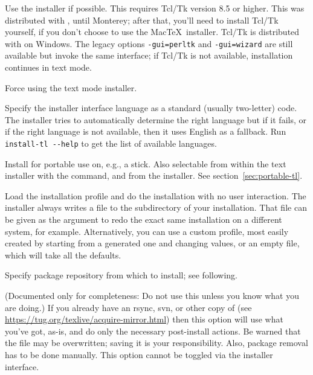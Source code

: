 \documentclass{article}
\begin{document}
\begin{ttdescription}
\item[-gui] Use the \GUI{} installer if possible. This requires
  Tcl/Tk version 8.5 or higher. This was distributed with \MacOSX, until
  Monterey; after that, you'll need to install Tcl/Tk yourself, if you
  don't choose to use the Mac\TeX\ installer. Tcl/Tk is
  distributed with \TL{} on Windows. The legacy options
  \texttt{-gui=perltk} and \texttt{-gui=wizard} are still available
  but invoke the same \GUI{} interface; if Tcl/Tk is not available,
  installation continues in text mode.

\item[-no-gui] Force using the text mode installer.

\item[-lang {\sl LL}] Specify the installer interface
  language as a standard (usually two-letter) code.  The installer tries
  to automatically determine the right language but if it fails, or if
  the right language is not available, then it uses English as a
  fallback.  Run \verb|install-tl --help| to get the list of available
  languages.

\item[-portable] Install for portable use on, e.g., a \USB{} stick.
  Also selectable from within the text installer with the 
  command, and from the \GUI{} installer.  See
  section~\ref{sec:portable-tl}.

\item[-profile {\sl file}] Load the installation profile  and
  do the installation with no user interaction.  The installer always
  writes a file  to the 
  subdirectory of your installation.  That file can be given as the
  argument to redo the exact same installation on a different system,
  for example.  Alternatively, you can use a custom profile, most easily
  created by starting from a generated one and changing values, or an
  empty file, which will take all the defaults.

\item [-repository {\sl url-or-directory}] Specify package
  repository from which to install; see following.

\item[-in-place] (Documented only for completeness: Do not use this
  unless you know what you are doing.) If you already have an rsync, svn,
  or other copy of \TL{} (see
  \url{https://tug.org/texlive/acquire-mirror.html}) then this option
  will use what you've got, as-is, and do only the necessary
  post-install actions.  Be warned that the file 
  may be overwritten; saving it is your responsibility.  Also, package
  removal has to be done manually. This option cannot be toggled via the
  installer interface.
\end{ttdescription}
\end{document}

